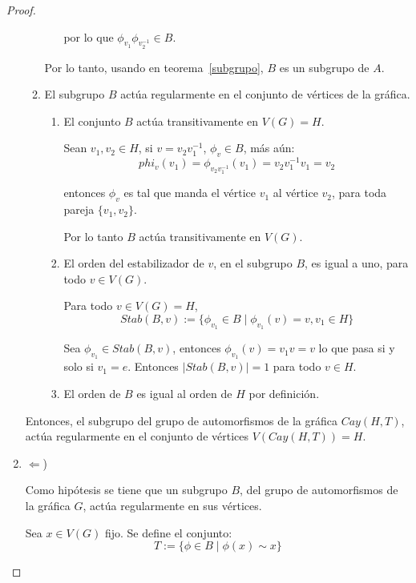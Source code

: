 \documentclass[12pt]{book}
\theoremstyle{definition}
\begin{document}
\begin{proof}
\begin{enumerate}
\begin{enumerate}
\begin{enumerate}
por lo que $\phi_{v_1}\phi_{v_2^{-1}} \in B$.
\end{enumerate}

Por lo tanto, usando en teorema~\ref{subgrupo}, $B$ es un subgrupo de
$A$.
 
\item
El subgrupo $B$ actúa regularmente en el conjunto de vértices de la gráfica.

\begin{enumerate}
\item\label{sab11} El conjunto $B$ actúa transitivamente en $V(G)=H$. 

Sean $v_1,v_2\in H$, si
  $v=v_2v_1^{-1}$, $\phi_v \in B$, más aún:
\begin{equation*}
phi_v(v_1)=\phi_{v_2v_1^{-1}}(v_1)=v_2v_1^{-1}v_1=v_2
\end{equation*}

entonces $\phi_v$ es tal que manda el vértice $v_1$ al vértice $v_2$,
para toda pareja $\{v_1,v_2\}$.

Por lo tanto $B$ actúa transitivamente en $V(G)$.

\item \label{sab12}
El orden del estabilizador de $v$, en el subgrupo $B$, es igual a uno, para todo
$v \in V(G)$. 

Para todo $v\in V(G)=H$, \begin{equation*}Stab(B,v):=\{\phi_{v_1}
  \in B \mid \phi_{v_1}(v)=v, v_1\in H \}\end{equation*}

  Sea $\phi_{v_1}\in Stab(B,v)$, entonces $\phi_{v_1}(v)=v_1v=v$ lo
  que pasa si y
  solo si $v_1=e$. Entonces $|Stab(B,v)| = 1$ para todo $v\in H$.
\item \label{sab13}El orden de $B$ es igual al orden de $H$ por definición.
\end{enumerate}
\end{enumerate}
Entonces, el subgrupo del
grupo de automorfismos de la gráfica $Cay(H,T)$,  actúa regularmente en
el conjunto de vértices $V(Cay(H,T))=H$. 

\smallskip

\item $\Leftarrow$) 

Como hipótesis se tiene que un subgrupo $B$, del grupo de automorfismos de
la gráfica $G$, actúa regularmente en sus vértices. 

Sea $x \in V(G)$ fijo. Se define el conjunto:
\begin{equation*} T:=\{
\phi \in B \mid \phi(x)\sim x\}\end{equation*}
\begin{enumerate}


\end{enumerate}
\end{enumerate}
\end{proof}
\end{document}
